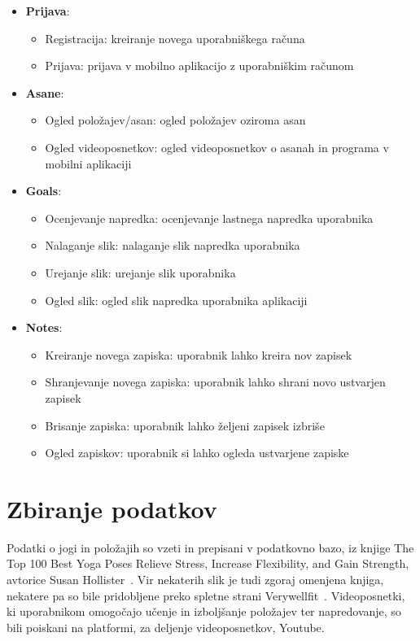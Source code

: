 \documentclass[a4paper, 12pt]{book}
\begin{document}
 \begin{itemize}
 \item \textbf{Prijava}:
 \begin{itemize}
   \item Registracija: kreiranje novega uporabniškega računa
  \item Prijava: prijava v mobilno aplikacijo z uporabniškim računom
 \end{itemize}

 \item \textbf{Asane}:
  \begin{itemize}
  \item Ogled položajev/asan: ogled položajev oziroma asan
  \item Ogled videoposnetkov: ogled videoposnetkov o asanah in programa v mobilni aplikaciji  
   \end{itemize}

   
\item \textbf{Goals}:
  \begin{itemize}
  \item Ocenjevanje napredka: ocenjevanje lastnega napredka uporabnika
  \item Nalaganje slik: nalaganje slik napredka uporabnika
  \item Urejanje slik: urejanje slik uporabnika
  \item Ogled slik: ogled slik napredka uporabnika aplikaciji
\end{itemize}
   
\item \textbf{Notes}:
  \begin{itemize}
  \item Kreiranje novega zapiska: uporabnik lahko kreira nov zapisek
  \item Shranjevanje novega zapiska: uporabnik lahko shrani novo ustvarjen zapisek
  \item Brisanje zapiska: uporabnik lahko željeni zapisek izbriše
  \item Ogled zapiskov: uporabnik si lahko ogleda ustvarjene zapiske
\end{itemize}

\end{itemize}

\section{Zbiranje podatkov}
Podatki o jogi in položajih so vzeti in prepisani v podatkovno bazo, iz knjige The Top 100 Best Yoga Poses Relieve Stress, Increase Flexibility, and Gain Strength, avtorice Susan Hollister~\cite{yoga}. Vir nekaterih slik je tudi zgoraj omenjena knjiga, nekatere pa so bile pridobljene preko spletne strani Verywellfit~\cite{verywellfit}. Videoposnetki, ki uporabnikom omogočajo učenje in izboljšanje položajev ter napredovanje, so bili poiskani na platformi, za deljenje videoposnetkov, Youtube.
\end{document}
